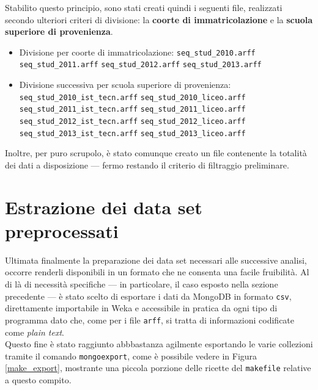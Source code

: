 	Stabilito questo principio, sono stati creati quindi i seguenti file, realizzati secondo ulteriori criteri di divisione: la \textbf{coorte di immatricolazione} e la \textbf{scuola superiore di provenienza}.

	\begin{itemize}
		\item Divisione per coorte di immatricolazione:
		\subitem \texttt{seq\_stud\_2010.arff}
		\subitem \texttt{seq\_stud\_2011.arff}
		\subitem \texttt{seq\_stud\_2012.arff}
		\subitem \texttt{seq\_stud\_2013.arff}
		\item Divisione successiva per scuola superiore di provenienza:
		\subitem \texttt{seq\_stud\_2010\_ist\_tecn.arff}
		\subitem \texttt{seq\_stud\_2010\_liceo.arff}
		\subitem \texttt{seq\_stud\_2011\_ist\_tecn.arff}
		\subitem \texttt{seq\_stud\_2011\_liceo.arff}
		\subitem \texttt{seq\_stud\_2012\_ist\_tecn.arff}
		\subitem \texttt{seq\_stud\_2012\_liceo.arff}
		\subitem \texttt{seq\_stud\_2013\_ist\_tecn.arff}
		\subitem \texttt{seq\_stud\_2013\_liceo.arff}
	\end{itemize}

	Inoltre, per puro scrupolo, è stato comunque creato un file contenente la totalità dei dati a disposizione --- fermo restando il criterio di filtraggio preliminare.

\section{Estrazione dei data set preprocessati}

	Ultimata finalmente la preparazione dei data set necessari alle successive analisi, occorre renderli disponibili in un formato che ne consenta una facile fruibilità. Al di là di necessità specifiche --- in particolare, il caso esposto nella sezione precedente ---  è stato scelto di esportare i dati da MongoDB in formato \texttt{csv}, direttamente importabile in Weka e accessibile in pratica da ogni tipo di programma dato che, come per i file \texttt{arff}, si tratta di informazioni codificate come \textit{plain text}. \\
	
	Questo fine è stato raggiunto abbbastanza agilmente esportando le varie collezioni tramite il comando \texttt{mongoexport}, come è possibile vedere in Figura \ref{make_export}, mostrante una piccola porzione delle ricette del \texttt{makefile} relative a questo compito. \\

